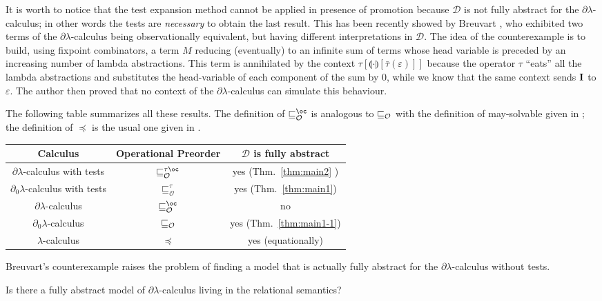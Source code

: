 \documentclass{LMCS}
\newcommand{\dlam}{\ensuremath{\partial\lambda}}
\newcommand{\dzlam}{\ensuremath{\partial_0\lambda}}
\newcommand{\lam}{\ensuremath{\lambda}}
\newcommand{\bang}{\oc}
\renewcommand{\hole}[1]{\llparenthesis #1\rrparenthesis}
\newcommand{\Tobsle}{\sqsubseteq^{\gt}_{\mathcal{O}}}
\newcommand{\Fobsle}{\sqsubseteq^{\gt\bang}_{\mathcal{O}}}
\newcommand{\gt}{\ensuremath{\tau}}
\newcommand{\gto}{\ensuremath{\bar\tau}}
\newcommand{\cD}{\mathcal{D}}
\begin{document}
It is worth to notice that the test expansion method cannot be applied in presence of promotion because $\cD$ is not fully abstract 
for the \dlam-calculus; in other words the tests are \emph{necessary} to obtain the last result.
This has been recently showed by Breuvart \cite{Breuvart}, who exhibited two terms of the \dlam-calculus 
being observationally equivalent, but having different interpretations in $\cD$. 
The idea of the counterexample is to build, using fixpoint combinators, a term $M$ reducing (eventually) to an infinite sum of terms whose
head variable is preceded by an increasing number of lambda abstractions. 
This term is annihilated by the context $\gt[\hole{\cdot}[\gto(\varepsilon)]]$ because the operator $\gt$ ``eats'' all the lambda abstractions and 
substitutes the head-variable of each component of the sum by 0, while we know that the same context sends $\bold{I}$ to $\varepsilon$. 
The author then proved that no context of the \dlam-calculus can simulate this behaviour.

The following table summarizes all these results.
The definition of $\obsle^\oc$ is analogous to $\sqsubseteq_{\mathcal{O}}$ with the definition of may-solvable given in \cite{PaganiR10};
the definition of $\preceq$ is the usual one given in \cite{MorrisTh}.

\begin{center}
\begin{tabular}{|c|c|c|}
\hline
Calculus               			& Operational Preorder & $\cD$ is fully abstract \\
\hline
\dlam-calculus with tests   			& $\Fobsle$ & yes (Thm.~\ref{thm:main2} ) \\
\dzlam-calculus with tests			& $\Tobsle$  & yes (Thm.~\ref{thm:main1}) \\
\dlam-calculus     				& $\obsle^\oc$ & no \cite{Breuvart} \\
\dzlam-calculus         			& $\sqsubseteq_{\mathcal{O}}$ & yes (Thm.~\ref{thm:main1-1}) \\
\lam-calculus             			& $\preceq$ & yes (equationally) \cite{Manzonetto09}\\
\hline
\end{tabular}
\end{center}

Breuvart's counterexample raises the problem of finding a model that is actually fully abstract for the \dlam-calculus without tests.

\begin{qu}\label{Q1} Is there a fully abstract model of \dlam-calculus living in the relational semantics?
\end{qu}
\end{document}
